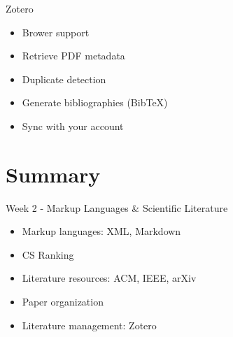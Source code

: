 \documentclass{../TexTemplate/myslide}
\begin{document}
\begin{frame}{Zotero}
\begin{itemize}
	\item Brower support
	\item Retrieve PDF metadata
	\item Duplicate detection
	\item Generate bibliographies (Bib\TeX)
	\item Sync with your account
\end{itemize}
\end{frame}

\section{Summary}
\begin{frame}
\sectionpage
\end{frame}

\begin{frame}{Week 2 - Markup Languages \& Scientific Literature}
\begin{itemize}
	\item Markup languages: XML, Markdown
	\item CS Ranking
	\item Literature resources: ACM, IEEE, arXiv
	\item Paper organization
	\item Literature management: Zotero
\end{itemize}
\end{frame}
\end{document}
